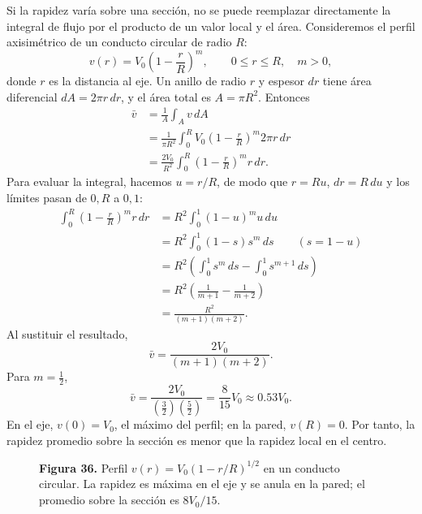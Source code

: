 Si la rapidez varía sobre una sección, no se puede reemplazar directamente la integral de flujo por el producto de un valor local y el área. Consideremos el perfil axisimétrico de un conducto circular de radio $R$:
\[
v(r)=V_0\left(1-\frac{r}{R}\right)^m,
\qquad 0\le r\le R,\quad m>0,
\]
donde $r$ es la distancia al eje. Un anillo de radio $r$ y espesor $dr$ tiene área diferencial $dA=2\pi r\,dr$, y el área total es $A=\pi R^2$. Entonces
\[
\begin{aligned}
\bar v
&=\frac{1}{A}\int_Av\,dA\\
&=\frac{1}{\pi R^2}\int_0^R
V_0\left(1-\frac{r}{R}\right)^m2\pi r\,dr\\
&=\frac{2V_0}{R^2}\int_0^R
\left(1-\frac{r}{R}\right)^m r\,dr.
\end{aligned}
\]
Para evaluar la integral, hacemos $u=r/R$, de modo que $r=Ru$, $dr=R\,du$ y los límites pasan de $0,R$ a $0,1$:
\[
\begin{aligned}
\int_0^R\left(1-\frac{r}{R}\right)^m r\,dr
&=R^2\int_0^1(1-u)^m u\,du\\
&=R^2\int_0^1(1-s)s^m\,ds
\qquad (s=1-u)\\
&=R^2\left(\int_0^1s^m\,ds-\int_0^1s^{m+1}\,ds\right)\\
&=R^2\left(\frac{1}{m+1}-\frac{1}{m+2}\right)\\
&=\frac{R^2}{(m+1)(m+2)}.
\end{aligned}
\]
Al sustituir el resultado,
\[
\boxed{\bar v=\frac{2V_0}{(m+1)(m+2)}.}
\]
Para $m=\tfrac12$,
\[
\bar v
=\frac{2V_0}{(\tfrac32)(\tfrac52)}
=\frac{8}{15}V_0
\approx0.53V_0.
\]
En el eje, $v(0)=V_0$, el máximo del perfil; en la pared, $v(R)=0$. Por tanto, la rapidez promedio sobre la sección es menor que la rapidez local en el centro.

\begin{figure}[H]
\centering
{}
\par\medskip
\textbf{Figura 36.} Perfil $v(r)=V_0(1-r/R)^{1/2}$ en un conducto circular. La rapidez es máxima en el eje y se anula en la pared; el promedio sobre la sección es $8V_0/15$.
\end{figure}

